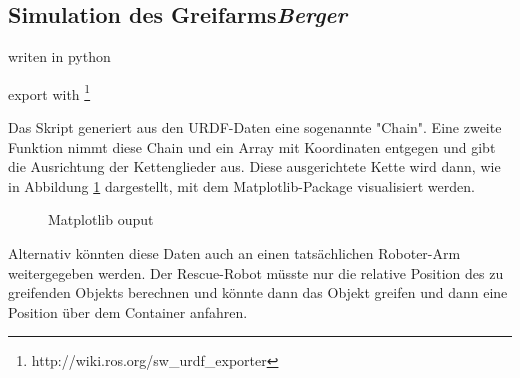 \subsection{Simulation des Greifarms\hfill\textnormal{\emph{Berger}}}
writen in python 

export with \footnote{http://wiki.ros.org/sw\_urdf\_exporter}

Das Skript generiert aus den URDF-Daten eine sogenannte "Chain".
Eine zweite Funktion nimmt diese Chain und ein Array mit Koordinaten entgegen
und gibt die Ausrichtung der Kettenglieder aus.
Diese ausgerichtete Kette wird dann, 
wie in Abbildung \ref{fig:greifarm1} dargestellt,
mit dem Matplotlib-Package visualisiert werden.

\begin{figure}[H]
  \caption{Matplotlib ouput}
  \label{fig:greifarm1}
\end{figure}

Alternativ könnten diese Daten auch an einen tatsächlichen Roboter-Arm weitergegeben werden.
Der Rescue-Robot müsste nur die relative Position des zu greifenden Objekts berechnen
und könnte dann das Objekt greifen und dann eine Position über dem Container anfahren.
